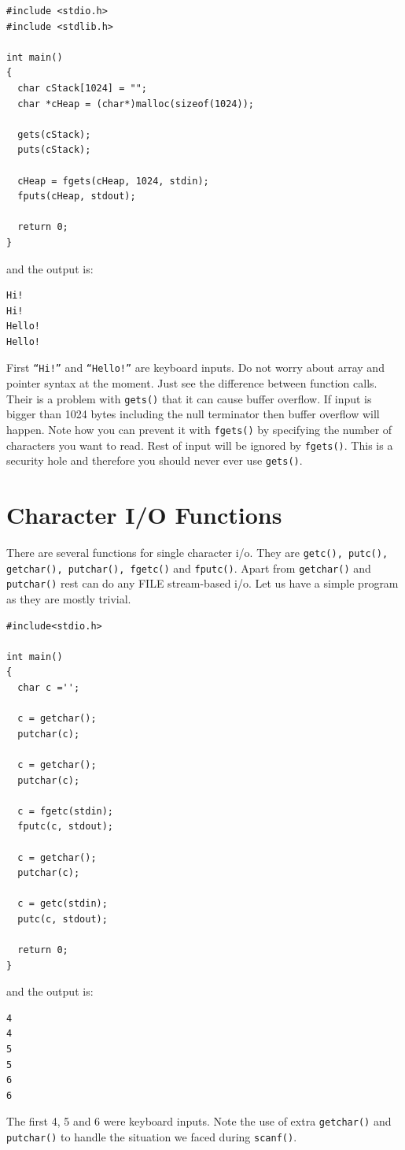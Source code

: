 \begin{Verbatim}[frame=single]
#include <stdio.h>
#include <stdlib.h>

int main()
{
  char cStack[1024] = "";
  char *cHeap = (char*)malloc(sizeof(1024));

  gets(cStack);
  puts(cStack);

  cHeap = fgets(cHeap, 1024, stdin);
  fputs(cHeap, stdout);

  return 0;
}
\end{Verbatim}

and the output is:

\begin{Verbatim}[frame=single]
Hi!
Hi!
Hello!
Hello!
\end{Verbatim}

First \texttt{``Hi!''} and \texttt{``Hello!''} are keyboard inputs. Do not
worry about array and pointer syntax at the moment. Just see the difference
between function calls. Their is a problem with \texttt{gets()} that it can
cause buffer overflow. If input is bigger than 1024 bytes including the null
terminator then buffer overflow will happen. Note how you can prevent it with
\texttt{fgets()} by specifying the number of characters you want to read. Rest
of input will be ignored by \texttt{fgets()}. This is a security hole and
therefore you should never ever use \texttt{gets()}.

\section{Character I/O Functions}
There are several functions for single character i/o. They are \texttt{getc(),
  putc(), getchar(), putchar(), fgetc()} and \texttt{fputc()}. Apart from
\texttt{getchar()} and \texttt{putchar()} rest can do any FILE stream-based
i/o. Let us have a simple program as they are mostly trivial.

\begin{Verbatim}[frame=single]
#include<stdio.h>

int main()
{
  char c ='';

  c = getchar();
  putchar(c);

  c = getchar();
  putchar(c);

  c = fgetc(stdin);
  fputc(c, stdout);

  c = getchar();
  putchar(c);

  c = getc(stdin);
  putc(c, stdout);

  return 0;
}
\end{Verbatim}

and the output is:

\begin{Verbatim}[frame=single]
4
4
5
5
6
6
\end{Verbatim}

The first 4, 5 and 6 were keyboard inputs. Note the use of extra
\texttt{getchar()} and \texttt{putchar()} to handle the situation we faced
during \texttt{scanf()}.


